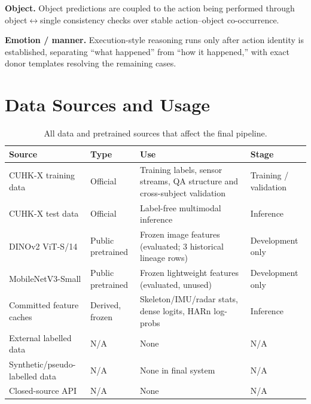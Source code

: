 \documentclass[12pt,a4paper]{article}
\begin{document}
\textbf{Object.}
Object predictions are coupled to the action being performed through
object$\leftrightarrow$single consistency checks over stable action--object
co-occurrence.

\textbf{Emotion / manner.}
Execution-style reasoning runs only after action identity is established,
separating ``what happened'' from ``how it happened,'' with exact donor
templates resolving the remaining cases.

\section{Data Sources and Usage}

\begin{table}[ht]
\centering
\small
\begin{tabularx}{\textwidth}{
    p{3.35cm}
    p{2.1cm}
    X
    p{2.15cm}
}
\toprule
\textbf{Source} & \textbf{Type} & \textbf{Use} & \textbf{Stage} \\
\midrule

CUHK-X training data &
Official &
Training labels, sensor streams, QA structure and cross-subject validation &
Training / validation \\

CUHK-X test data &
Official &
Label-free multimodal inference &
Inference \\

DINOv2 ViT-S/14 &
Public pretrained &
Frozen image features (evaluated; 3 historical lineage rows) &
Development only \\

MobileNetV3-Small &
Public pretrained &
Frozen lightweight features (evaluated, unused) &
Development only \\

Committed feature caches &
Derived, frozen &
Skeleton/IMU/radar stats, dense logits, HARn log-probs &
Inference \\

External labelled data &
N/A &
None &
N/A \\

Synthetic/pseudo-labelled data &
N/A &
None in final system &
N/A \\

Closed-source API &
N/A &
None &
N/A \\

\bottomrule
\end{tabularx}
\caption{All data and pretrained sources that affect the final pipeline.}
\end{table}
\end{document}
